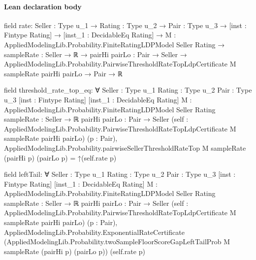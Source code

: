 \documentclass[10pt]{article}
\begin{document}
\paragraph{Lean declaration body}
\begin{ReviewVerbatim}
field rate:
{Seller : Type u_1} →
  {Rating : Type u_2} →
    {Pair : Type u_3} →
      [inst : Fintype Rating] →
        [inst_1 : DecidableEq Rating] →
          {M : AppliedModelingLib.Probability.FiniteRatingLDPModel Seller Rating} →
            {sampleRate : Seller → ℝ} →
              {pairHi pairLo : Pair → Seller} →
                AppliedModelingLib.Probability.PairwiseThresholdRateTopLdpCertificate M sampleRate pairHi pairLo →
                  Pair → ℝ

field threshold_rate_top_eq:
∀ {Seller : Type u_1} {Rating : Type u_2} {Pair : Type u_3} [inst : Fintype Rating] [inst_1 : DecidableEq Rating]
  {M : AppliedModelingLib.Probability.FiniteRatingLDPModel Seller Rating} {sampleRate : Seller → ℝ}
  {pairHi pairLo : Pair → Seller}
  (self : AppliedModelingLib.Probability.PairwiseThresholdRateTopLdpCertificate M sampleRate pairHi pairLo) (p : Pair),
  AppliedModelingLib.Probability.pairwiseSellerThresholdRateTop M sampleRate (pairHi p) (pairLo p) = ↑(self.rate p)

field leftTail:
∀ {Seller : Type u_1} {Rating : Type u_2} {Pair : Type u_3} [inst : Fintype Rating] [inst_1 : DecidableEq Rating]
  {M : AppliedModelingLib.Probability.FiniteRatingLDPModel Seller Rating} {sampleRate : Seller → ℝ}
  {pairHi pairLo : Pair → Seller}
  (self : AppliedModelingLib.Probability.PairwiseThresholdRateTopLdpCertificate M sampleRate pairHi pairLo) (p : Pair),
  AppliedModelingLib.Probability.ExponentialRateCertificate
    (AppliedModelingLib.Probability.twoSampleFloorScoreGapLeftTailProb M sampleRate (pairHi p) (pairLo p)) (self.rate p)
\end{ReviewVerbatim}
\end{document}

